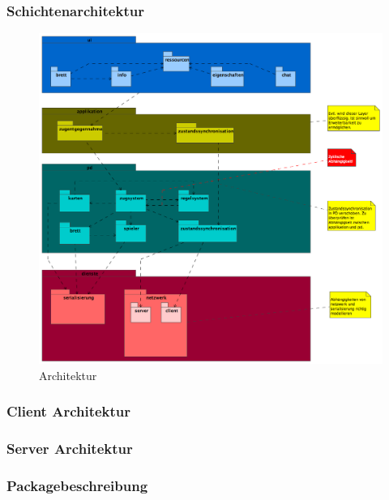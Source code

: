 \documentclass[a4paper,12pt,halfparskip,DIV14]{scrartcl}
\begin{document}
\subsubsection{Schichtenarchitektur} %
\label{sub:schichtenarchitektur}
\begin{figure}
	[htp] \centering 
	\includegraphics[width=1\textwidth]{Architektur.png} \caption{Architektur}\label{fig:Architektur.png} 
\end{figure}

\subsubsection{Client Architektur} %
\label{sub:client_architektur}

\subsubsection{Server Architektur} %
\label{sub:server_architektur}

\subsubsection{Packagebeschreibung} %
\label{sub:pagebeschreibung}
\end{document}
